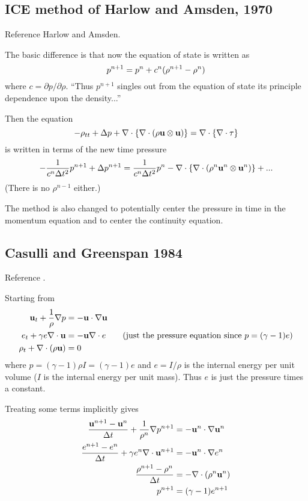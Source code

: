 \documentclass[10pt]{article}
\begin{document}
\subsection{ICE method of Harlow and Amsden, 1970}

Reference Harlow and Amsden\cite{Harlow70}.


The basic difference is that now the equation of state is written as
\[
    p^{n+1} = p^n + c^n( \rho^{n+1} -\rho^n)
\]
where $c= \partial p / \partial \rho$. ``Thus $p^{n+1}$ singles out from the equation
of state its principle dependence upon the density...''

Then the equation
\[
    -\rho_{tt} + \Delta p + \nabla\cdot\left\{\nabla\cdot( \rho {\bf u}\otimes {\bf u} ) \right\} 
                  = \nabla\cdot\left\{ \nabla\cdot {\bf \tau} \right\} 
\]
is written in terms of the new time pressure
\[
   - {1\over c^n \Delta t^2} p^{n+1}  + \Delta p^{n+1} 
       = {1\over c^n \Delta t^2} p^{n} - \nabla\cdot\left\{\nabla\cdot( \rho^n {\bf u}^n\otimes {\bf u}^n ) \right\}  + ...
\]
(There is no $\rho^{n-1}$ either.)

The method is also changed to potentially center the pressure in time in the momentum equation and
to center the continuity equation.


\subsection{Casulli and Greenspan 1984}

Reference \cite{Casulli84}.

Starting from
\begin{align*}
   {\bf u}_t + {1\over\rho}\nabla p &= -{\bf u}\cdot\nabla{\bf u} \\
   e_t + \gamma e \nabla\cdot{\bf u} &= -  {\bf u}\nabla\cdot e  \qquad\mbox{(just the pressure equation since $p=(\gamma-1)e$)} \\
   \rho_t + \nabla\cdot(\rho{\bf u}) &= 0 
\end{align*}
where  $p = (\gamma-1) \rho I = (\gamma-1)e$ and $e=I/\rho$ is the internal energy per unit volume ($I$ is the
internal energy per unit mass). Thus $e$ is just the pressure times a constant. 


Treating some terms implicitly gives
\begin{align*}
 {{\bf u}^{n+1} - {\bf u}^n \over \Delta t} + {1\over\rho^n}\nabla p^{n+1} &= -{\bf u}^n\cdot\nabla{\bf u}^n \\
 {e^{n+1} - e^n \over \Delta t} + \gamma e^n \nabla\cdot{\bf u}^{n+1} &=  -{\bf u}^n\cdot\nabla e^n \\
  {\rho^{n+1} - \rho^n \over \Delta t} &= - \nabla\cdot(\rho^n{\bf u}^n)   \\
  p^{n+1} &= (\gamma-1) e^{n+1} 
\end{align*}
\end{document}
